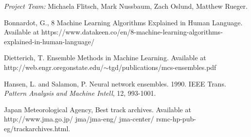 \documentclass{SBCbookchapter}
\begin{document}
 

\emph{Project Team:} Michaela Flitsch, Mark Nussbaum, Zach Oslund, Matthew Rueger.

\newpage
 \begin{thebibliography}{9}

   {Bonnardot, G.}, 8 Machine Learning Algorithms Explained in Human Language. Available at https://www.datakeen.co/en/8-machine-learning-algorithms-explained-in-human-language/
 
  {Dietterich, T.} Ensemble Methods in Machine Learning.  Available at http://web.engr.oregonstate.edu/$\sim$tgd/publications/mcs-ensembles.pdf
 
  {Hansen, L. and Salamon, P.} Neural network ensembles. 1990. IEEE Trans. \emph{Pattern Analysis and Machine Intell}, 12, 993-1001.
 
 {Japan Meteorological Agency},  Best track archives. Available at  http://www.jma.go.jp/ jma/jma-eng/ jma-center/ rsmc-hp-pub-eg/trackarchives.html.

\end{thebibliography}
\end{document}
